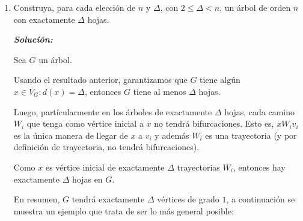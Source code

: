 \documentclass{article}
\begin{document}
\begin{enumerate}
\begin{enumerate}
\begin{proof}
          Por la caracterizaci\'on de \'arbol, sabemos que $G$ es ac\'iclico
          y por tanto, los caminos que parten desde $x$ (tienen a $x$
          como v\'ertice inicial) hacia algunos de sus $\Delta$ vecinos no tienen
          v\'ertices en com\'un que sean distintos de $x$. En caso contrario, habr\'ia $2$
          trayectorias que tienen inicio en $x$ a las que llamaremos $w_1$ y $w_2$, y
          adem\'as tienen en com\'un al menos un v\'ertice $v$ y por tanto, $w_1 w_2$ es
          un ciclo!! que est\'a contenido en $G$.

          Luego, como $x$ tiene $\Delta$ vecinos, entonces podemos tomar al menos
          $\Delta$ trayectorias distintas entre ellas tales que terminen en alg\'un
          v\'ertice $u_i$ ($1 \leq i \leq \Delta$).

          Así, cada $u_i$ es una hoja de $G$ y como hemos encontrado $\Delta$ hojas
          podemos concluir que el \'arbol $G$ con grado m\'aximo $\Delta$ tiene al menos
          $\Delta$ hojas. \\
          \\
        \end{proof}
  \newpage
      \item Construya, para cada elecci\'on de $n$ y $\Delta$,
        con $2\le \Delta < n$, un \'arbol de orden $n$ con
        exactamente $\Delta$ hojas.

          \textbf{\textit{Soluci\'on:}}

          Sea $G$ un \'arbol.

          Usando el resultado anterior, garantizamos que $G$ tiene alg\'un
          $x \in V_G : d(x) = \Delta$, entonces $G$ tiene al menos $\Delta$ hojas.

          Luego, part\'icularmente en los \'arboles de
          exactamente $\Delta$ hojas, cada camino $W_i$ que tenga como v\'ertice
          inicial a $x$ no tendr\'a bifurcaciones. Esto es, $x W_i v_i$ es la
          \'unica manera de llegar de $x$ a $v_i$ y adem\'as $W_i$ es una trayectoria
          (y por definici\'on de trayectoria, no tendr\'a bifurcaciones).

          Como $x$ es v\'ertice inicial de exactamente $\Delta$ trayectorias $W_i$,
          entonces hay exactamente $\Delta$ hojas en $G$.

          En resumen, $G$ tendr\'a exactamente $\Delta$ v\'ertices de grado $1$,
          a continuaci\'on se muestra un ejemplo que trata de ser lo m\'as general
          posible:


\end{enumerate}
\end{enumerate}
\end{document}
